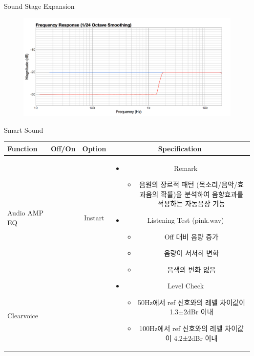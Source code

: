 \documentclass{beamer}
\begin{document}
\begin{frame}[t]{Sound Stage Expansion}
		\begin{figure}[b]
			\includegraphics[height=0.32\textwidth]{figure/sxp.png}
		\end{figure}
		
	\end{frame}
	
	
	\begin{frame}[t]{Smart Sound}
		\begin{tiny}
			\begin{tabular}{@{}lccc@{}}
				\toprule
				Function & Off/On & Option & Specification \\
				\midrule
				Audio AMP EQ & \color{black}{Off} & Instart &
				\multirow{14}{60mm}{
					\begin{itemize}
						\item Remark
						\begin{itemize}
							\item 음원의 장르적 패턴 (목소리/음악/효과음의 확률)을 분석하여 음향효과를 적용하는 자동음장 기능
						\end{itemize}
						\item Listening Test (pink.wav)
						\begin{itemize}
							\item Off 대비 음량 증가
							\item 음량이 서서히 변화
							\item 음색의 변화 없음
						\end{itemize}
						\item Level Check
						\begin{itemize}
							\item 50Hz에서 ref 신호와의 레벨 차이값이 1.3±2dBr 이내
							\item 100Hz에서 ref 신호와의 레벨 차이값이 4.2±2dBr 이내
						\end{itemize}
					\end{itemize}
				} \\
				Clearvoice & \color{black}{Off} & & \\

\end{tabular}
\end{tiny}
\end{frame}
\end{document}
